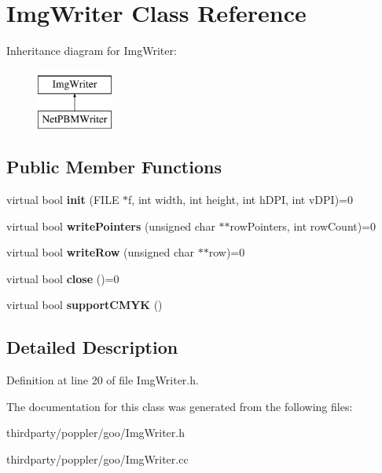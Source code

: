 \hypertarget{class_img_writer}{}\section{Img\+Writer Class Reference}
\label{class_img_writer}
Inheritance diagram for Img\+Writer\+:\begin{figure}[H]
\begin{center}
\leavevmode
\includegraphics[height=2.000000cm]{class_img_writer}
\end{center}
\end{figure}
\subsection*{Public Member Functions}
\begin{DoxyCompactItemize}
\item 
\mbox{\label{class_img_writer_a34c5c527f930875e4a89f52c8b95218a}} 
virtual bool {\bfseries init} (F\+I\+LE $\ast$f, int width, int height, int h\+D\+PI, int v\+D\+PI)=0
\item 
\mbox{\label{class_img_writer_ae5c287c178a4469dc14b2af011e7ad35}} 
virtual bool {\bfseries write\+Pointers} (unsigned char $\ast$$\ast$row\+Pointers, int row\+Count)=0
\item 
\mbox{\label{class_img_writer_afbaef92a7ff7d0f1448f503d87d8dd17}} 
virtual bool {\bfseries write\+Row} (unsigned char $\ast$$\ast$row)=0
\item 
\mbox{\label{class_img_writer_a8309997ba9cd5ca084df2bd10e124d71}} 
virtual bool {\bfseries close} ()=0
\item 
\mbox{\label{class_img_writer_a5ca2e752fc28c53a346c6ab92ed48b32}} 
virtual bool {\bfseries support\+C\+M\+YK} ()
\end{DoxyCompactItemize}


\subsection{Detailed Description}


Definition at line 20 of file Img\+Writer.\+h.



The documentation for this class was generated from the following files\+:\begin{DoxyCompactItemize}
\item 
thirdparty/poppler/goo/Img\+Writer.\+h\item 
thirdparty/poppler/goo/Img\+Writer.\+cc\end{DoxyCompactItemize}
